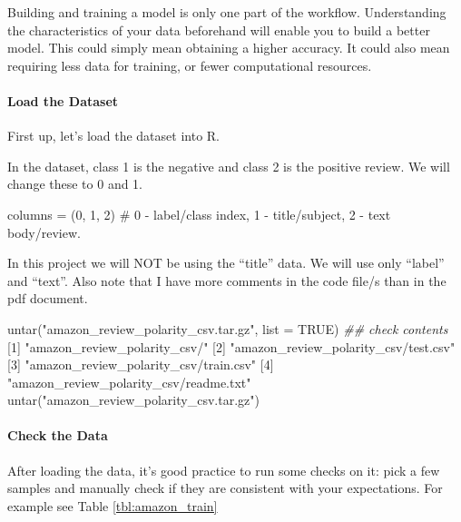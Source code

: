 \documentclass[
]{article}
\newenvironment{Shaded}{}{}
\newcommand{\AttributeTok}[1]{\textcolor[rgb]{0.49,0.56,0.16}{#1}}
\newcommand{\ConstantTok}[1]{\textcolor[rgb]{0.53,0.00,0.00}{#1}}
\newcommand{\DecValTok}[1]{\textcolor[rgb]{0.25,0.63,0.44}{#1}}
\newcommand{\DocumentationTok}[1]{\textcolor[rgb]{0.73,0.13,0.13}{\textit{#1}}}
\newcommand{\FunctionTok}[1]{\textcolor[rgb]{0.02,0.16,0.49}{#1}}
\newcommand{\NormalTok}[1]{#1}
\newcommand{\StringTok}[1]{\textcolor[rgb]{0.25,0.44,0.63}{#1}}
\begin{document}
Building and training a model is only one part of the workflow.
Understanding the characteristics of your data beforehand will enable
you to build a better model. This could simply mean obtaining a higher
accuracy. It could also mean requiring less data for training, or fewer
computational resources.

\hypertarget{load-the-dataset}{%
\paragraph{Load the Dataset}\label{load-the-dataset}}

First up, let's load the dataset into R.

In the dataset, class 1 is the negative and class 2 is the positive
review. We will change these to 0 and 1.

columns = (0, 1, 2) \# 0 - label/class index, 1 - title/subject, 2 -
text body/review.

In this project we will NOT be using the ``title'' data. We will use
only ``label'' and ``text''. Also note that I have more comments in the
code file/s than in the pdf document.

\begin{Shaded}
\begin{Highlighting}[]
\FunctionTok{untar}\NormalTok{(}\StringTok{"amazon\_review\_polarity\_csv.tar.gz"}\NormalTok{, }\AttributeTok{list =} \ConstantTok{TRUE}\NormalTok{)  }\DocumentationTok{\#\# check contents}
\NormalTok{[}\DecValTok{1}\NormalTok{] }\StringTok{"amazon\_review\_polarity\_csv/"}          
\NormalTok{[}\DecValTok{2}\NormalTok{] }\StringTok{"amazon\_review\_polarity\_csv/test.csv"}  
\NormalTok{[}\DecValTok{3}\NormalTok{] }\StringTok{"amazon\_review\_polarity\_csv/train.csv"} 
\NormalTok{[}\DecValTok{4}\NormalTok{] }\StringTok{"amazon\_review\_polarity\_csv/readme.txt"}
\FunctionTok{untar}\NormalTok{(}\StringTok{"amazon\_review\_polarity\_csv.tar.gz"}\NormalTok{)}
\end{Highlighting}
\end{Shaded}

\newpage

\hypertarget{check-the-data}{%
\paragraph{Check the Data}\label{check-the-data}}

After loading the data, it's good practice to run some checks on it:
pick a few samples and manually check if they are consistent with your
expectations. For example see Table \ref{tbl:amazon_train}
\end{document}
